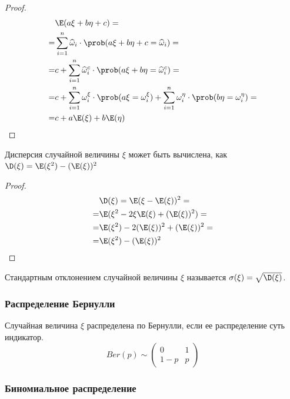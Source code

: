\documentclass[12pt]{article}
\begin{document}
\begin{proof}
    \begin{align*}
        &\E(a\xi+b\eta+c)=\\
        =&\sum_{i=1}^n \widehat{\omega}_i\cdot\prob(a\xi+b\eta+c=\widehat{\omega}_i)=\\
        =&c+\sum_{i=1}^n \widehat{\omega}_i^c\cdot\prob(a\xi+b\eta=\widehat{\omega}_i^c)=\\
        =&c+\sum_{i=1}^n \omega_i^\xi\cdot \prob(a\xi=\omega_i^\xi)+\sum_{i=1}^n \omega_i^\eta\cdot\prob(b\eta=\omega_i^\eta)=\\            =&c+a\E(\xi)+b\E(\eta)
    \end{align*}
\end{proof}

\begin{theorem}
    Дисперсия случайной величины $\xi$ может быть вычислена, как $\D(\xi)=\E(\xi^2)-(\E(\xi))^2$
\end{theorem}

\begin{proof}
    \begin{align*}
        &\D(\xi)=\E(\xi-\E(\xi))^2=\\
        =&\E(\xi^2-2\xi\E(\xi)+(\E(\xi))^2)=\\
        =&\E(\xi^2)-2(\E(\xi))^2+(\E(\xi))^2=\\
        =&\E(\xi^2)-(\E(\xi))^2
    \end{align*}
\end{proof}

\begin{definition}
    Стандартным отклонением случайной величины $\xi$ называется $\sigma(\xi)=\sqrt{\D(\xi)}$.
\end{definition}

    \subsubsection{Распределение Бернулли}

\begin{definition}
    Случайная величина $\xi$  распределена по Бернулли, если ее распределение суть индикатор.
    $$Ber(p)\sim \begin{pmatrix}
        0 & 1\\
        1-p & p
    \end{pmatrix}$$
\end{definition}

    \subsubsection{Биномиальное распределение}
\end{document}
